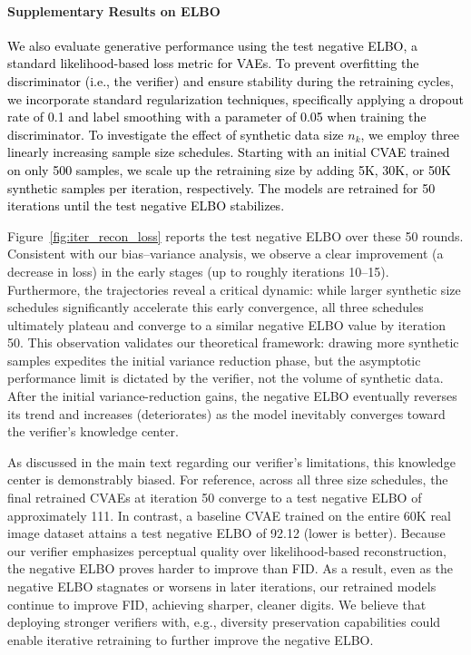 \paragraph{Supplementary Results on ELBO}
\textcolor{black}{
We also evaluate generative performance using the test negative ELBO, a standard likelihood-based loss metric for VAEs. 
To prevent overfitting the discriminator (i.e., the verifier) and ensure stability during the retraining cycles, we incorporate standard regularization techniques, specifically applying a dropout rate of 0.1 and label smoothing with a parameter of 0.05 when training the discriminator.
To investigate the effect of synthetic data size $n_k$, we employ three linearly increasing sample size schedules.
Starting with an initial CVAE trained on only 500 samples, we scale up the retraining size by adding 5K, 30K, or 50K synthetic samples per iteration, respectively.
The models are retrained for 50 iterations until the test negative ELBO stabilizes.}

Figure~\ref{fig:iter_recon_loss} reports the test negative ELBO over these 50 rounds.
Consistent with our bias--variance analysis, we observe a clear improvement (a decrease in loss) in the early stages (up to roughly iterations 10--15).
Furthermore, the trajectories reveal a critical dynamic: while larger synthetic size schedules significantly accelerate this early convergence, all three schedules ultimately plateau and converge to a similar negative ELBO value by iteration 50. 
This observation validates our theoretical framework: drawing more synthetic samples expedites the initial variance reduction phase, but the asymptotic performance limit is dictated by the verifier, not the volume of synthetic data.
After the initial variance-reduction gains, the negative ELBO eventually reverses its trend and increases (deteriorates) as the model inevitably converges toward the verifier's knowledge center.

As discussed in the main text regarding our verifier's limitations, this knowledge center is demonstrably biased.
For reference, across all three size schedules, the final retrained CVAEs at iteration 50 converge to a test negative ELBO of approximately 111. In contrast, a baseline CVAE trained on the entire 60K real image dataset attains a test negative ELBO of 92.12 (lower is better).
Because our verifier emphasizes perceptual quality over likelihood-based reconstruction, the negative ELBO proves harder to improve than FID. 
As a result, even as the negative ELBO stagnates or worsens in later iterations, our retrained models continue to improve FID, achieving sharper, cleaner digits.
We believe that deploying stronger verifiers with, e.g., diversity preservation capabilities could enable iterative retraining to further improve the negative ELBO.




